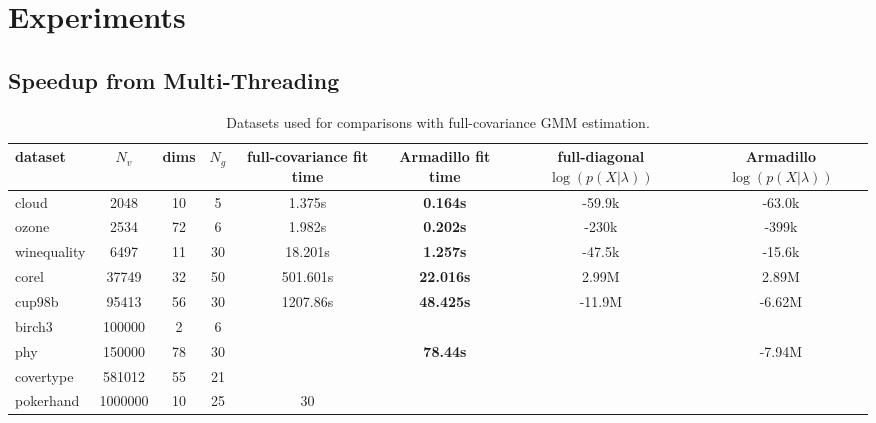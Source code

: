 \section{Experiments}
\label{sec:speedup}

\subsection{Speedup from Multi-Threading}

\begin{table*}
\begin{center}
\begin{tabular}{|l|c|c|c|c|c|c|c|}
\hline
{\bf dataset} & {\bf $N_v$} & {\bf dims} & {\bf $N_g$} & {\bf full-covariance fit time} & {\bf Armadillo fit time} & {\bf full-diagonal $\log(p(X|\lambda))$} & {\bf Armadillo $\log(p(X|\lambda))$} \\
\hline
cloud & 2048 & 10 & 5 & 1.375s & {\bf 0.164s} & -59.9k & -63.0k \\
ozone & 2534 & 72 & 6 & 1.982s & {\bf 0.202s} & -230k & -399k \\
winequality & 6497 & 11 & 30 & 18.201s & {\bf 1.257s} & -47.5k & -15.6k
\\
corel & 37749 & 32 & 50 & 501.601s & {\bf 22.016s} & 2.99M & 2.89M \\
cup98b & 95413 & 56 & 30 & 1207.86s & {\bf 48.425s} & -11.9M & -6.62M \\
birch3 & 100000 & 2 & 6 & \\
phy & 150000 & 78 & 30 & & {\bf 78.44s} & & -7.94M \\
covertype & 581012 & 55 & 21 & \\
pokerhand & 1000000 & 10 & 25 & 30 & \\
\hline
\end{tabular}
\end{center}
\caption{Datasets used for comparisons with full-covariance GMM estimation.}
\label{tab:results}
\end{table*}


